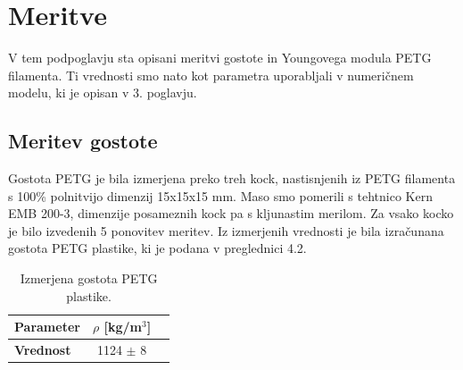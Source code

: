 \documentclass[12pt]{report}
\begin{document}
\section{Meritve}
V tem podpoglavju sta opisani meritvi gostote in Youngovega modula PETG filamenta. Ti vrednosti smo nato kot parametra uporabljali v numeričnem modelu, ki
je opisan v 3. poglavju. 

\subsection{Meritev gostote}
Gostota PETG je bila izmerjena preko treh kock, nastisnjenih iz PETG filamenta s 100\% polnitvijo dimenzij 15x15x15 mm. Maso smo pomerili s tehtnico Kern EMB 200-3, dimenzije posameznih
kock pa s kljunastim merilom. Za vsako kocko je bilo izvedenih 5 ponovitev meritev. Iz izmerjenih vrednosti je bila izračunana gostota PETG plastike, ki je podana v preglednici 4.2.

\begin{table}[H]
  \caption{Izmerjena gostota PETG plastike.}
  \centering
  \begin{tabular}{ | l | c | r | }
    \hline
    \textbf{Parameter} & $\rho$ [kg/m$^3$] \\ \hline
    \textbf{Vrednost} & 1124 $\pm$ 8 \\
    \hline  
  \end{tabular}
\end{table}
\end{document}

